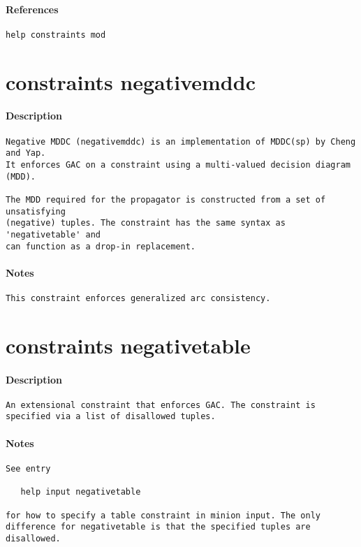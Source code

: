 \paragraph{References}
{\footnotesize
\begin{verbatim}
help constraints mod
\end{verbatim}
}
\section{constraints negativemddc}
\paragraph{Description}
{\footnotesize
\begin{verbatim}
Negative MDDC (negativemddc) is an implementation of MDDC(sp) by Cheng and Yap. 
It enforces GAC on a constraint using a multi-valued decision diagram (MDD). 

The MDD required for the propagator is constructed from a set of unsatisfying
(negative) tuples. The constraint has the same syntax as 'negativetable' and
can function as a drop-in replacement. 
\end{verbatim}
}
\paragraph{Notes}
{\footnotesize
\begin{verbatim}
This constraint enforces generalized arc consistency.
\end{verbatim}
}
\section{constraints negativetable}
\paragraph{Description}
{\footnotesize
\begin{verbatim}
An extensional constraint that enforces GAC. The constraint is
specified via a list of disallowed tuples.
\end{verbatim}
}
\paragraph{Notes}
{\footnotesize
\begin{verbatim}
See entry 

   help input negativetable

for how to specify a table constraint in minion input. The only
difference for negativetable is that the specified tuples are
disallowed.
\end{verbatim}
}

